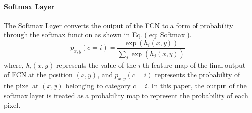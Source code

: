 \paragraph*{Softmax Layer}
The Softmax Layer converts the output of the FCN to a form of probability through the softmax function as shown in Eq. (\ref{eq: Softmax}).
\begin{equation}\label{eq: Softmax}
    p_{x,y}(c=i) = \frac{\exp(h_i(x,y))}{\sum_j \exp(h_j(x,y))}
\end{equation}
where, $h_i(x,y)$ represents the value of the $i$-th feature map of the final output of FCN at the position $(x,y)$, and $p_{x,y}(c=i)$ represents the probability of the pixel at $(x,y)$ belonging to category $c=i$. In this paper, the output of the softmax layer is treated as a probability map to represent the probability of each pixel.

